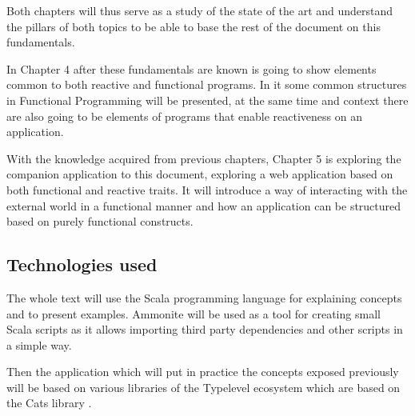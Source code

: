 \documentclass[../main.tex]{subfiles}
\begin{document}
Both chapters will thus serve as a study of the state of the art and understand the
pillars of both topics to be able to base the rest of the document on this fundamentals.

In Chapter 4 after these fundamentals are known is going to show elements common to
both reactive and functional programs. In it some common structures in
Functional Programming will be presented, at the same time and context there are
also going to be elements of programs that enable reactiveness on an application.

With the knowledge acquired from previous chapters, Chapter 5 is exploring the
companion application to this document, exploring a web application based on
both functional and reactive traits. It will introduce a way of interacting with
the external world in a functional manner and how an application can be
structured based on purely functional constructs.

\subsection{Technologies used}
The whole text will use the Scala programming language for explaining concepts
and to present examples. Ammonite \autocite{Ammonite} will be used as a tool for
creating small Scala scripts as it allows importing third party dependencies and
other scripts in a simple way.

Then the application which will put in practice the concepts exposed previously
will be based on various libraries of the Typelevel ecosystem
\autocite{2020Typelevel.scala} which are based on the Cats library \autocite{Cats:Home}.
\end{document}
